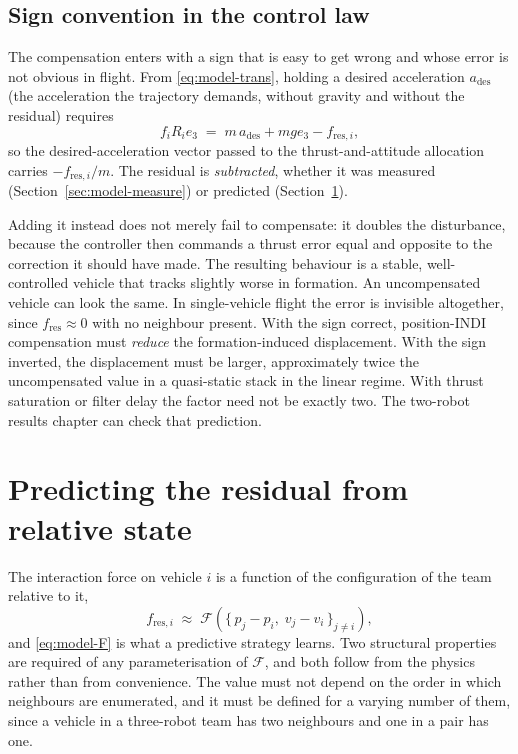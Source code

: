 \subsection{Sign convention in the control law}
\label{sec:model-sign}

The compensation enters with a sign that is easy to get wrong and whose error is not obvious in
flight. From \eqref{eq:model-trans}, holding a desired acceleration $a_{\mathrm{des}}$ (the acceleration the
trajectory demands, without gravity and without the residual) requires
%
\begin{equation}
  f_i R_i e_3 \;=\; m\,a_{\mathrm{des}} + m g e_3 - f_{\mathrm{res},i},
  \label{eq:model-sign}
\end{equation}
%
so the desired-acceleration vector passed to the thrust-and-attitude allocation carries
$-f_{\mathrm{res},i}/m$. The residual is \emph{subtracted}, whether it was measured
(Section~\ref{sec:model-measure}) or predicted (Section~\ref{sec:model-deepsets}).

Adding it instead does not merely fail to compensate: it doubles the disturbance, because the
controller then commands a thrust error equal and opposite to the correction it should have made.
The resulting behaviour is a stable, well-controlled vehicle that tracks slightly worse in
formation. An uncompensated vehicle can look the same. In single-vehicle flight the error is
invisible altogether, since $f_{\mathrm{res}} \approx 0$ with no neighbour present. With the sign
correct, position-INDI compensation must \emph{reduce} the formation-induced displacement. With
the sign inverted, the displacement must be larger, approximately twice the uncompensated value
in a quasi-static stack in the linear regime. With thrust saturation or filter delay the factor
need not be exactly two. The two-robot results chapter can check that prediction.

\section{Predicting the residual from relative state}
\label{sec:model-deepsets}

The interaction force on vehicle $i$ is a function of the configuration of the team relative to it,
%
\begin{equation}
  f_{\mathrm{res},i} \;\approx\; \mathcal{F}\!\left( \{\, p_j - p_i,\; v_j - v_i \,\}_{j \neq i} \right),
  \label{eq:model-F}
\end{equation}
%
and \eqref{eq:model-F} is what a predictive strategy learns. Two structural properties are required
of any parameterisation of $\mathcal{F}$, and both follow from the physics rather than from
convenience. The value must not depend on the order in which neighbours are enumerated, and it must
be defined for a varying number of them, since a vehicle in a three-robot team has two neighbours
and one in a pair has one.

